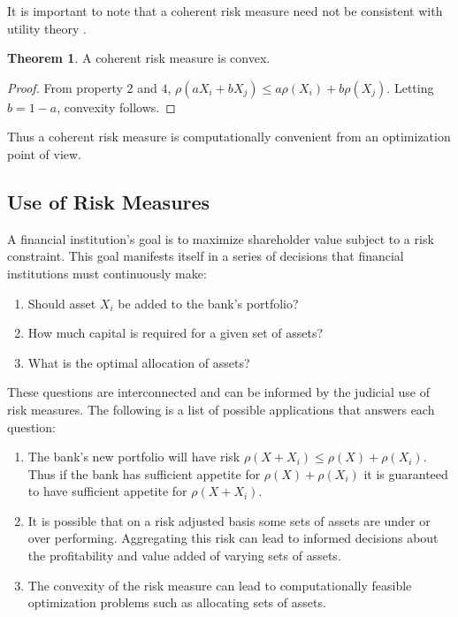 \documentclass[12pt]{article}
\theoremstyle{definition}
\newtheorem{theorem}{Theorem}
\begin{document}
It is important to note that a coherent risk measure need not be consistent with utility theory \cite{tsanakas2003}.  

\begin{theorem}  A coherent risk measure is convex. 
\end{theorem}

\begin{proof}

From property \(2\) and \(4\), \(\rho(aX_i+bX_j)\leq a\rho(X_i)+b \rho(X_j)\).  Letting \(b=1-a\), convexity follows.

\end{proof}

Thus a coherent risk measure is computationally convenient from an optimization point of view.

\subsection{Use of Risk Measures}

A financial institution's goal is to maximize shareholder value subject to a risk constraint.  This goal manifests itself in a series of decisions that financial institutions must continuously make:

\begin{enumerate}
\item Should asset \(X_i\) be added to the bank's portfolio?
\item How much capital is required for a given set of assets?
\item What is the optimal allocation of assets?
\end{enumerate}

These questions are interconnected and can be informed by the judicial use of risk measures.  The following is a list of possible applications that answers each question:
\begin{enumerate}
\item The bank's new portfolio will have risk \(\rho(X+X_i)\leq \rho(X)+\rho(X_i)\).  Thus if the bank has sufficient appetite for \(\rho(X)+\rho(X_i)\) it is guaranteed to have sufficient appetite for \(\rho(X+X_i)\).
\item It is possible that on a risk adjusted basis some sets of assets are under or over performing.  Aggregating this risk can lead to informed decisions about the profitability and value added of varying sets of assets.  
\item The convexity of the risk measure can lead to computationally feasible optimization problems such as allocating sets of assets.  
\end{enumerate}
\end{document}
